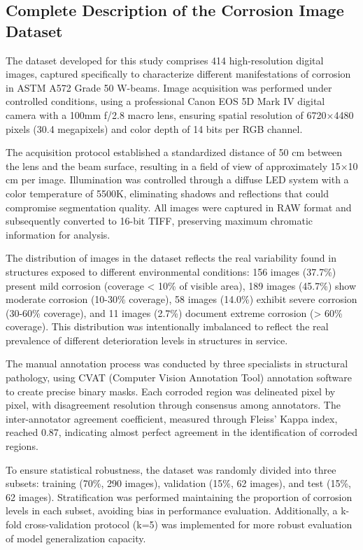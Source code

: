 \documentclass[12pt,a4paper,twoside]{article}
\begin{document}
\subsection{Complete Description of the Corrosion Image Dataset}
\label{subsec:dataset}

The dataset developed for this study comprises 414 high-resolution digital images, captured specifically to characterize different manifestations of corrosion in ASTM A572 Grade 50 W-beams. Image acquisition was performed under controlled conditions, using a professional Canon EOS 5D Mark IV digital camera with a 100mm f/2.8 macro lens, ensuring spatial resolution of 6720×4480 pixels (30.4 megapixels) and color depth of 14 bits per RGB channel.

The acquisition protocol established a standardized distance of 50 cm between the lens and the beam surface, resulting in a field of view of approximately 15×10 cm per image. Illumination was controlled through a diffuse LED system with a color temperature of 5500K, eliminating shadows and reflections that could compromise segmentation quality. All images were captured in RAW format and subsequently converted to 16-bit TIFF, preserving maximum chromatic information for analysis.

The distribution of images in the dataset reflects the real variability found in structures exposed to different environmental conditions: 156 images (37.7\%) present mild corrosion (coverage < 10\% of visible area), 189 images (45.7\%) show moderate corrosion (10-30\% coverage), 58 images (14.0\%) exhibit severe corrosion (30-60\% coverage), and 11 images (2.7\%) document extreme corrosion (> 60\% coverage). This distribution was intentionally imbalanced to reflect the real prevalence of different deterioration levels in structures in service.

The manual annotation process was conducted by three specialists in structural pathology, using CVAT (Computer Vision Annotation Tool) annotation software to create precise binary masks. Each corroded region was delineated pixel by pixel, with disagreement resolution through consensus among annotators. The inter-annotator agreement coefficient, measured through Fleiss' Kappa index, reached 0.87, indicating almost perfect agreement in the identification of corroded regions.

To ensure statistical robustness, the dataset was randomly divided into three subsets: training (70\%, 290 images), validation (15\%, 62 images), and test (15\%, 62 images). Stratification was performed maintaining the proportion of corrosion levels in each subset, avoiding bias in performance evaluation. Additionally, a k-fold cross-validation protocol (k=5) was implemented for more robust evaluation of model generalization capacity.
\end{document}

